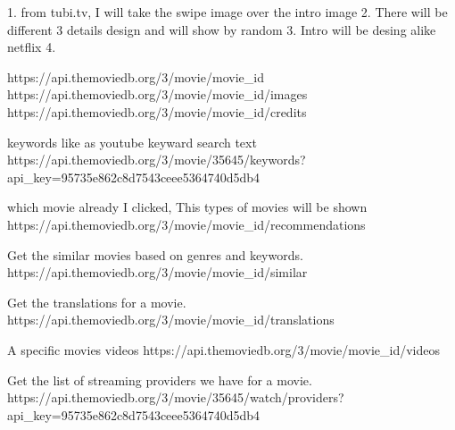1. from tubi.tv, I will take the swipe image over the intro image
2. There will be different 3 details design and will show by random
3. Intro will be desing alike netflix
4.

https://api.themoviedb.org/3/movie/{movie_id}
https://api.themoviedb.org/3/movie/{movie_id}/images
https://api.themoviedb.org/3/movie/{movie_id}/credits

keywords like as youtube keyward search text
https://api.themoviedb.org/3/movie/35645/keywords?api_key=95735e862c8d7543ceee5364740d5db4

which movie already I clicked, This types of movies will be shown
https://api.themoviedb.org/3/movie/{movie_id}/recommendations

Get the similar movies based on genres and keywords.
https://api.themoviedb.org/3/movie/{movie_id}/similar

Get the translations for a movie.
https://api.themoviedb.org/3/movie/{movie_id}/translations

A specific movies videos
https://api.themoviedb.org/3/movie/{movie_id}/videos

Get the list of streaming providers we have for a movie.
https://api.themoviedb.org/3/movie/35645/watch/providers?api_key=95735e862c8d7543ceee5364740d5db4